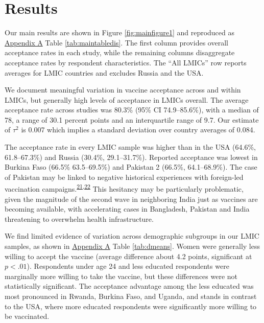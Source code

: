 \documentclass[
  12pt,
]{article}
\begin{document}
\hypertarget{results}{%
\section*{Results}\label{results}}

Our main results are shown in Figure \ref{fig:mainfigure1} and reproduced as \protect\hyperlink{appendixd}{Appendix A} Table \ref{tab:maintabledis}. The first column provides overall acceptance rates in each study, while the remaining columns disaggregate acceptance rates by respondent characteristics. The ``All LMICs'' row reports averages for LMIC countries and excludes Russia and the USA.

We document meaningful variation in vaccine acceptance across and within LMICs, but generally high levels of acceptance in LMICs overall. The average acceptance rate across studies was 80.3\% (95\% CI 74.9--85.6\%), with a median of 78, a range of 30.1 percent points and an interquartile range of 9.7. Our estimate of \(\tau^2\) is 0.007 which implies a standard deviation over country averages of 0.084.

The acceptance rate in every LMIC sample was higher than in the USA (64.6\%, 61.8--67.3\%) and Russia (30.4\%, 29.1--31.7\%). Reported acceptance was lowest in Burkina Faso (66.5\% 63.5--69.5\%) and Pakistan 2 (66.5\%, 64.1--68.9\%). The case of Pakistan may be linked to negative historical experiences with foreign-led vaccination campaigns.\textsuperscript{\protect\hyperlink{ref-ali2019polio}{21},\protect\hyperlink{ref-robbins2012cia}{22}} This hesitancy may be particularly problematic, given the magnitude of the second wave in neighboring India just as vaccines are becoming available, with accelerating cases in Bangladesh, Pakistan and India threatening to overwhelm health infrastructure.

We find limited evidence of variation across demographic subgroups in our LMIC samples, as shown in \protect\hyperlink{appendixd}{Appendix A} Table \ref{tab:dmeans}. Women were generally less willing to accept the vaccine (average difference about 4.2 points, significant at \(p<.01\)). Respondents under age 24 and less educated respondents were marginally more willing to take the vaccine, but these differences were not statistically significant. The acceptance advantage among the less educated was most pronounced in Rwanda, Burkina Faso, and Uganda, and stands in contrast to the USA, where more educated respondents were significantly more willing to be vaccinated.
\end{document}
